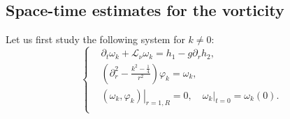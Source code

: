 \documentclass[final, 12pt,reqno]{amsart}
\numberwithin{equation}{section}
\begin{document}
\subsection{Space-time estimates for the vorticity}
Let us first  study the following system for $k\neq0:$
\begin{equation}\label{5.1}
    \left\{
    \begin{aligned}
    &\partial_t \omega_k+\mathcal{L}_\nu \omega_k=h_1-g\partial_{r}h_2, \\
    &\left(\partial_r^2-\frac{k^2-\frac{1}{4}}{r^2}\right)  \varphi_k=\omega_k,\\
    &\left. (\omega_k,\varphi_k)\right|_{r=1, R}=0, \quad \left. \omega_k\right|_{t=0}=\omega_k(0).\\
\end{aligned}
    \right.
\end{equation}
\end{document}
